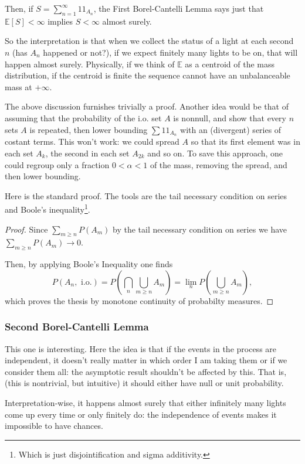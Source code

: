 Then, if $S = \sum_{n=1}^{\infty} 1\!\!1_{A_n}$, the First Borel-Cantelli Lemma says just that $\mathbb{E}[S] < \infty$ implies $S < \infty$ almost surely.

So the interpretation is that when we collect the status of a light at each second $n$ (has $A_n$ happened or not?), if we expect finitely many lights to be on, that will happen almost surely. Physically, if we think of $\mathbb{E}$ as a centroid of the mass distribution, if the centroid is finite the sequence cannot have an unbalanceable mass at $+\infty$. 

The above discussion furnishes trivially a proof. Another idea would be that of assuming that the probability of the i.o. set $A$ is nonnull, and show that every $n$ sets $A$ is repeated, then lower bounding $\sum 1\!\!1_{A_n}$ with an (divergent) series of costant terms. This won't work: we could spread $A$ so that its first element was in each set $A_k$, the second in each set $A_{2k}$ and so on. To save this approach, one could regroup only a fraction $0 < \alpha < 1$ of the mass, removing the spread, and then lower bounding.

Here is the standard proof. The tools are the tail necessary condition on series and Boole's inequality\footnote{Which is just disjointification and sigma additivity.}.

\begin{proof}
	Since $\sum_{m \geq n} P(A_m)$ by the tail necessary condition on series we have $\sum_{m \geq n} P(A_m) \to 0$. 
	
	Then, by applying Boole's Inequality one finds
	\[
	P(A_n,\text{ i.o.}) = P(\bigcap_n\bigcup_{m \geq n} A_m) = \lim \limits_n P(\bigcup_{m \geq n} A_m),
	\] 
	which proves the thesis by monotone continuity of probabilty measures.
\end{proof}

\subsubsection{Second Borel-Cantelli Lemma}
This one is interesting. Here the idea is that if the events in the process are independent, it doesn't really matter in which order I am taking them or if we consider them all: the asymptotic result shouldn't be affected by this. That is, (this is nontrivial, but intuitive) it should either have null or unit probability.

Interpretation-wise, it happens almost surely that either infinitely many lights come up every time or only finitely do: the independence of events makes it impossible to have chances. 

